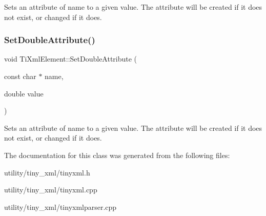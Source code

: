 Sets an attribute of name to a given value. The attribute will be created if it does not exist, or changed if it does. \hypertarget{class_ti_xml_element_a0d1dd975d75496778177e35abfe0ec0b}{}\label{class_ti_xml_element_a0d1dd975d75496778177e35abfe0ec0b} 
\subsubsection{\texorpdfstring{Set\+Double\+Attribute()}{SetDoubleAttribute()}}
{\footnotesize\ttfamily void Ti\+Xml\+Element\+::\+Set\+Double\+Attribute (\begin{DoxyParamCaption}\item[{const char $\ast$}]{name,  }\item[{double}]{value }\end{DoxyParamCaption})}

Sets an attribute of name to a given value. The attribute will be created if it does not exist, or changed if it does. 

The documentation for this class was generated from the following files\+:\begin{DoxyCompactItemize}
\item 
utility/tiny\+\_\+xml/tinyxml.\+h\item 
utility/tiny\+\_\+xml/tinyxml.\+cpp\item 
utility/tiny\+\_\+xml/tinyxmlparser.\+cpp\end{DoxyCompactItemize}
